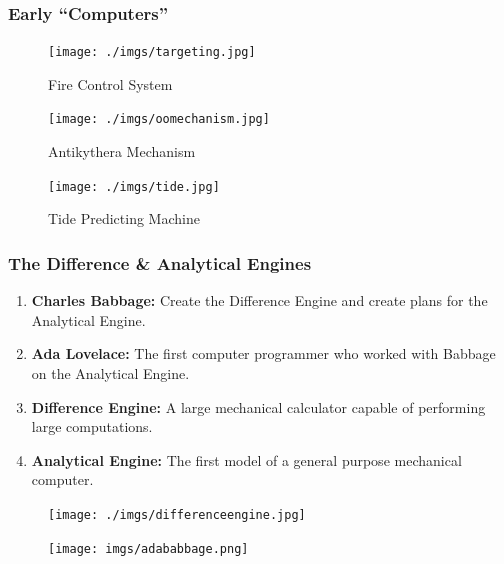 \documentclass{beamer}
\begin{document}
%
%
\begin{frame}
  \frametitle{Early ``Computers''}
  \begin{minipage}{0.49\textwidth}
    \begin{figure}
      \texttt{[image: ./imgs/targeting.jpg]}
      \label{fig:target}
      \caption{Fire Control System}
    \end{figure}
    \begin{figure}
      \texttt{[image: ./imgs/oomechanism.jpg]}
      \label{fig:oomechanism}
      \caption{Antikythera Mechanism}
    \end{figure}
  \end{minipage}
  \begin{minipage}{0.49\textwidth}
    \begin{figure}
      \texttt{[image: ./imgs/tide.jpg]}
      \label{fig:tide}
      \caption{Tide Predicting Machine}
    \end{figure}
  \end{minipage}
\end{frame}

%
%
\begin{frame}
  \frametitle{The Difference \& Analytical Engines}
  \begin{minipage}{0.59\textwidth}
    \begin{enumerate}
      \item \textbf{Charles Babbage: } Create the Difference Engine and create plans for the Analytical Engine.
      \item \textbf{Ada Lovelace: } The first computer programmer who worked with Babbage on the Analytical Engine.
      \item \textbf{Difference Engine: } A large mechanical calculator capable of performing large computations.
      \item \textbf{Analytical Engine: } The first model of a general purpose mechanical computer.
    \end{enumerate}
    \hfill
  \end{minipage}
  \begin{minipage}{0.39\textwidth}
    \centering
    \begin{figure}
      \texttt{[image: ./imgs/differenceengine.jpg]}
      \label{fig:analyticalengine.png}
    \end{figure}
    \begin{figure}
      \texttt{[image: imgs/adababbage.png]}
      \label{fig:adababbage.png}
    \end{figure}
  \end{minipage}
\end{frame}
\end{document}
